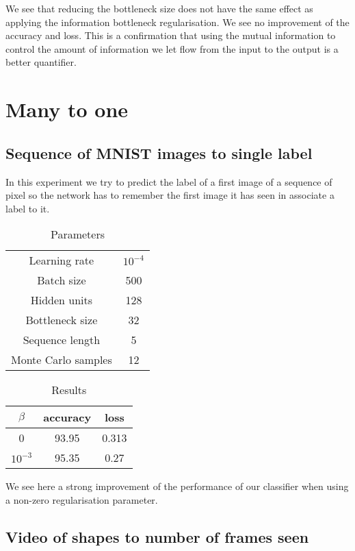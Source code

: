 \documentclass[10pt,oneside,openright]{report}
\begin{document}
We see that reducing the bottleneck size does not have the same effect as applying the information bottleneck regularisation. We see no improvement of the accuracy and loss. This is a confirmation that using the mutual information to control the amount of information we let flow from the input to the output is a better quantifier.

\section{Many to one}
\subsection{Sequence of MNIST images to single label}
In this experiment we try to predict the label of a first image of a sequence of pixel so the network has to remember the first image it has seen in associate a label to it.


\begin {table}[H]
\begin{center}
\begin{tabular}{ c | c  }
 Learning rate & $10^{-4}$ \\
 Batch size & 500\\
 Hidden units & 128 \\
 Bottleneck size & 32 \\
 Sequence length & 5 \\
 Monte Carlo samples & 12
\end{tabular}
\end{center}
\caption{Parameters}
\end {table}

\begin {table}[H]
\begin{center}
\begin{tabular}{ c | c c }
 $\beta$ & accuracy & loss \\
 \hline
0 & 93.95 & 0.313 \\
$10^{-3}$ & 95.35 & 0.27 \\
\end{tabular}
\end{center}
\caption{Results}
\end {table}

We see here a strong improvement of the performance of our classifier when using a non-zero regularisation parameter. 

\subsection{Video of shapes to number of frames seen}
\end{document}
